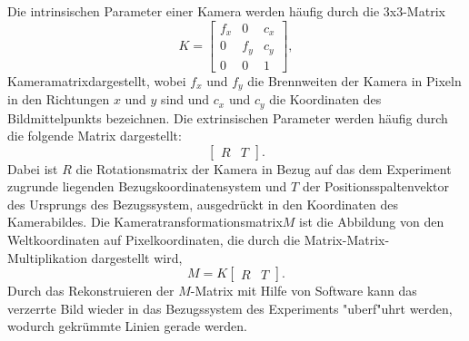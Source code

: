 \documentclass[arbeit=studie,oneside,BCOR=12mm]{ArbeitRST}
\begin{document}
Die intrinsischen Parameter
einer Kamera werden häufig durch die 3x3-Matrix 
\begin{equation} 
    K = 
    \begin{bmatrix} 
        f_x & 0 & c_x\\ 
        0 & f_y & c_y\\ 
        0 & 0 & 1
    \end{bmatrix}, 
\end{equation} 
\glqq Kameramatrix\grqq dargestellt, wobei $f_x$ und $f_y$ die Brennweiten der
Kamera in Pixeln in den Richtungen $x$ und $y$ sind und $c_x$ und $c_y$ die
Koordinaten des Bildmittelpunkts bezeichnen. Die extrinsischen Parameter werden
häufig durch die folgende Matrix dargestellt: 
\begin{equation}
    \begin{bmatrix} R & T \end{bmatrix}. 
\end{equation} 
Dabei ist $R$ die Rotationsmatrix der Kamera in Bezug auf das dem Experiment zugrunde 
liegenden Bezugskoordinatensystem und $T$
der Positionsspaltenvektor des Ursprungs des Bezugssystem, ausgedrückt in den
Koordinaten des Kamerabildes. Die \glqq Kameratransformationsmatrix\grqq $M$ ist die Abbildung von
den Weltkoordinaten auf Pixelkoordinaten, die durch die
Matrix-Matrix-Multiplikation dargestellt wird, 
\begin{equation} 
    M = K 
    \begin{bmatrix} 
        R & T
    \end{bmatrix}. 
\end{equation} 
Durch das Rekonstruieren der $M$-Matrix mit Hilfe von Software \cite{opencv} kann das verzerrte
Bild wieder in das Bezugssystem des Experiments "uberf"uhrt werden, wodurch gekrümmte Linien gerade
werden.
\end{document}
